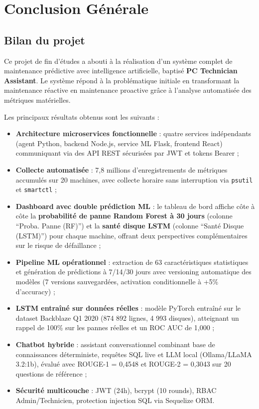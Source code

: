 \chapter*{Conclusion Générale}

\section*{Bilan du projet}

Ce projet de fin d'études a abouti à la réalisation d'un système complet de maintenance
prédictive avec intelligence artificielle, baptisé \textbf{PC Technician Assistant}.
Le système répond à la problématique initiale en transformant la maintenance réactive
en maintenance proactive grâce à l'analyse automatisée des métriques matérielles.

Les principaux résultats obtenus sont les suivants :

\begin{itemize}
  \item \textbf{Architecture microservices fonctionnelle} : quatre services indépendants
        (agent Python, backend Node.js, service ML Flask, frontend React) communiquant
        via des API REST sécurisées par JWT et tokens Bearer ;
  \item \textbf{Collecte automatisée} : 7,8 millions d'enregistrements de métriques
        accumulés sur 20 machines, avec collecte horaire sans interruption via
        \texttt{psutil} et \texttt{smartctl} ;
  \item \textbf{Dashboard avec double prédiction ML} : le tableau de bord affiche
        côte à côte la \textbf{probabilité de panne Random Forest à 30 jours} (colonne
        ``Proba. Panne (RF)'') et la \textbf{santé disque LSTM} (colonne ``Santé Disque
        (LSTM)'') pour chaque machine, offrant deux perspectives complémentaires sur le
        risque de défaillance ;
  \item \textbf{Pipeline ML opérationnel} : extraction de 63 caractéristiques statistiques
        et génération de prédictions à 7/14/30 jours avec versioning automatique des
        modèles (7 versions sauvegardées, activation conditionnelle à +5\% d'accuracy) ;
  \item \textbf{LSTM entraîné sur données réelles} : modèle PyTorch entraîné sur le
        dataset Backblaze Q1 2020 (874 892 lignes, 4 993 disques), atteignant un rappel
        de 100\% sur les pannes réelles et un ROC AUC de 1,000 ;
  \item \textbf{Chatbot hybride} : assistant conversationnel combinant base de
        connaissances déterministe, requêtes SQL live et LLM local (Ollama/LLaMA 3.2:1b),
        évalué avec ROUGE-1 = 0,4548 et ROUGE-2 = 0,3043 sur 20 questions de référence ;
  \item \textbf{Sécurité multicouche} : JWT (24h), bcrypt (10 rounds), RBAC
        Admin/Technicien, protection injection SQL via Sequelize ORM.
\end{itemize}

